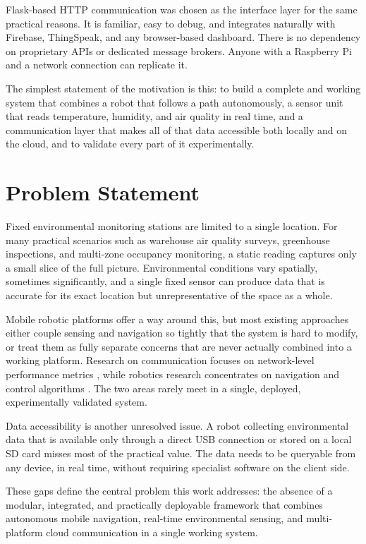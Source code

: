 Flask-based HTTP communication was chosen as the interface layer for
the same practical reasons. It is familiar, easy to debug, and
integrates naturally with Firebase, ThingSpeak, and any browser-based
dashboard. There is no dependency on proprietary APIs or dedicated
message brokers. Anyone with a Raspberry Pi and a network connection
can replicate it.

The simplest statement of the motivation is this: to build a complete
and working system that combines a robot that follows a path
autonomously, a sensor unit that reads temperature, humidity, and air
quality in real time, and a communication layer that makes all of that
data accessible both locally and on the cloud, and to validate every
part of it experimentally.

\section{Problem Statement}

Fixed environmental monitoring stations are limited to a single
location. For many practical scenarios such as warehouse air quality surveys,
greenhouse inspections, and multi-zone occupancy monitoring, a static
reading captures only a small slice of the full picture. Environmental
conditions vary spatially, sometimes significantly, and a single fixed
sensor can produce data that is accurate for its exact location but
unrepresentative of the space as a whole.

Mobile robotic platforms offer a way around this, but most existing
approaches either couple sensing and navigation so tightly that the
system is hard to modify, or treat them as fully separate concerns that
are never actually combined into a working platform. Research on
communication focuses on network-level performance metrics \cite{r4},
while robotics research concentrates on navigation and control
algorithms \cite{r8,r10}. The two areas rarely meet in a single,
deployed, experimentally validated system.

Data accessibility is another unresolved issue. A robot collecting
environmental data that is available only through a direct USB
connection or stored on a local SD card misses most of the practical
value. The data needs to be queryable from any device, in real time,
without requiring specialist software on the client side.

These gaps define the central problem this work addresses: the absence
of a modular, integrated, and practically deployable framework that
combines autonomous mobile navigation, real-time environmental sensing,
and multi-platform cloud communication in a single working system.

